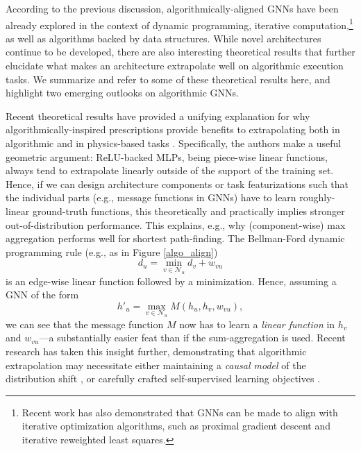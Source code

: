 \documentclass[twoside,11pt]{article}
\begin{document}
According to the previous discussion, algorithmically-aligned GNNs have been already explored in the context of dynamic programming, iterative computation,\footnote{Recent work \citep{yang2021graph} has also demonstrated that GNNs can be made to align with iterative optimization algorithms, such as proximal gradient descent and iterative reweighted least squares.} as well as algorithms backed by data structures. While novel architectures continue to be developed, there are also interesting theoretical results that further elucidate what makes an architecture extrapolate well on algorithmic execution tasks. We summarize and refer to some of these theoretical results here, and highlight two emerging outlooks on algorithmic GNNs.

Recent theoretical results have provided a unifying explanation for why algorithmically-inspired prescriptions provide benefits to extrapolating both in algorithmic and in physics-based tasks \citep{Xu2020}. Specifically, the authors make a useful geometric argument: ReLU-backed MLPs, being piece-wise linear functions, always tend to extrapolate {linearly} outside of the support of the training set. Hence, if we can design architecture components or task featurizations such that the individual parts (e.g., message functions in GNNs) have to learn roughly-linear ground-truth functions, this theoretically and practically implies stronger out-of-distribution performance. This explains, e.g., why (component-wise) max aggregation performs well for shortest path-finding. The Bellman-Ford dynamic programming rule (e.g., as in Figure \ref{algo_align})
\begin{equation}
	d_u = \min_{v\in\mathcal{N}_u} d_v + w_{vu}
\end{equation}
is an edge-wise linear function followed by a minimization. Hence, assuming a GNN of the form
\begin{equation}
	h'_u = \max_{v\in\mathcal{N}_u} M(h_u, h_v, w_{vu}),
\end{equation}
we can see that the message function $M$ now has to learn a \emph{linear function} in $h_v$ and $w_{vu}$---a substantially easier feat than if the sum-aggregation is used. Recent research has taken this insight further, demonstrating that algorithmic extrapolation may necessitate either maintaining a \emph{causal model} of the distribution shift \citep{bevilacqua2021size}, or carefully crafted self-supervised learning objectives \citep{yehudai2021local}.
\end{document}
